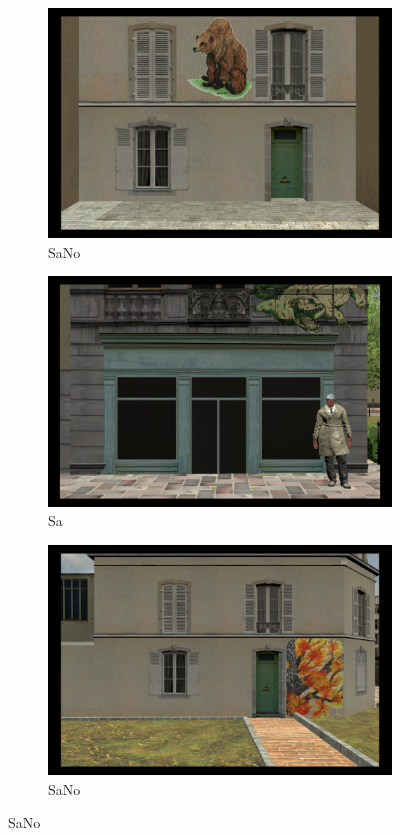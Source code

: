 \begin{figure}[h!]
	\begin{subfigure}[b]{0.32\linewidth}
		\includegraphics[width=\linewidth]{figures/07_R(bear)_noA.PNG}
		\caption{SaNo}
	\end{subfigure}
	\begin{subfigure}[b]{0.32\linewidth}
		\includegraphics[width=\linewidth]{figures/25_R(alogator)_A.PNG}
		\caption{Sa}
	\end{subfigure}
	\begin{subfigure}[b]{0.32\linewidth}
		\includegraphics[width=\linewidth]{figures/54_R(tree)_noA.PNG}
		\caption{SaNo}
	\end{subfigure}


\end{figure}
